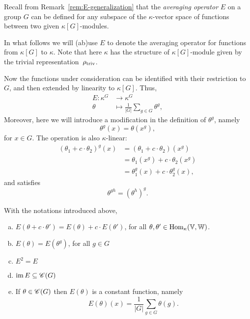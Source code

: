 \begin{ntn}
    Recall from\/ {\rm Remark~\ref{rem:E-generalization}} that the \textsl{averaging operator}\/ $E$ on a group\/ $G$ can be defined for any subspace of the\/ $\kappa$-vector space of functions between two given\/ $\kappa[G]$-modules. 
    
    In what follows we will (ab)use\/ $E$ to denote the averaging operator for functions from\/ $\kappa[G]$ to\/ $\kappa$. Note that here\/ $\kappa$ has the structure of\/ $\kappa[G]$-module given by the trivial representation~$\rho_{\mathrm{triv}}$.
    
    Now the functions under consideration can be identified with their restriction to\/ $G$, and then extended by linearity to\/ $\kappa[G]$. Thus,
    \begin{align*}
        E\colon\kappa^G&\to\kappa^G\\
        \theta&\mapsto\frac1{|G|}\sum_{g\in G}\theta^g,
    \end{align*}
    Moreover, here we will introduce a modification in the definition of\/ $\theta^g$, namely
    $$
        \theta^g(x)=\theta(x^g),
    $$
    for $x\in G$. The operation is also $\kappa$-linear:
    \begin{align*}
        (\theta_1+c\cdot\theta_2)^g(x)
            &= (\theta_1+c\cdot\theta_2)(x^g)\\
            &= \theta_1(x^g)+c\cdot\theta_2(x^g)\\
            &= \theta_1^g(x)+c\cdot\theta_2^g(x),
    \end{align*}
    and satisfies
    $$
        \theta^{gh} = (\theta^h)^g.
    $$
\end{ntn}

\begin{lem}\label{lem:E-2-properties}
    With the notations introduced above,
    \begin{enumerate}[a),font=\upshape]
        \item $E(\theta+c\cdot\theta')=E(\theta)+c\cdot E(\theta')$, for all\/ $\theta,\theta'\in{\rm Hom}_\kappa(\mathbb V,\mathbb W)$.

        \item $E(\theta)=E(\theta^g)$, for all\/ $g\in G$

        \item $E^2=E$

        \item $\operatorname{im}E\subseteq\operatorname{\mathscr C}(G)$
        
        \item If\/ $\theta\in\operatorname{\mathscr C}(G)$ then\/ $E(\theta)$ is a constant function, namely
        $$
            E(\theta)(x)=\frac1{|G|}\sum_{g\in G}\theta(g).
        $$
    \end{enumerate}
\end{lem}

